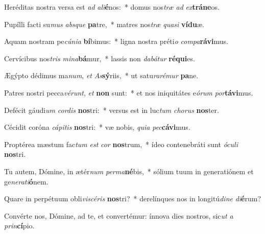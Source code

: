 \item Heréditas nostra versa est \textit{ad} \textit{a}\textit{li}\textbf{é}nos:~* domus nos\textit{træ} \textit{ad} \textit{ex}\textbf{trá}\textbf{ne}os.
\item Pupílli facti su\textit{mus} \textit{abs}\textit{que} \textbf{pa}tre,~* matres nos\textit{træ} \textit{qua}\textit{si} \textbf{ví}\textbf{du}æ.
\item Aquam nostram pe\textit{cú}\textit{ni}\textit{a} \textbf{bí}bimus:~* ligna nostra préti\textit{o} \textit{com}\textit{pa}\textbf{rá}\textbf{vi}mus.
\item Cervícibus nos\textit{tris} \textit{mi}\textit{na}\textbf{bá}mur,~* lassis non \textit{da}\textit{bá}\textit{tur} \textbf{ré}\textbf{qui}es.
\item Ægýpto dédimus ma\textit{num}, \textit{et} \textit{As}\textbf{sý}riis,~* ut satu\textit{ra}\textit{ré}\textit{mur} \textbf{pa}ne.
\item Patres nostri pecca\textit{vé}\textit{runt}, \textit{et} \textbf{non} sunt:~* et nos iniquitátes e\textit{ó}\textit{rum} \textit{por}\textbf{tá}\textbf{vi}mus.
\item Defécit gáudi\textit{um} \textit{cor}\textit{dis} \textbf{nos}tri:~* versus est in luc\textit{tum} \textit{cho}\textit{rus} \textbf{nos}ter.
\item Cécidit coróna \textit{cá}\textit{pi}\textit{tis} \textbf{nos}tri:~* væ nobis, \textit{qui}\textit{a} \textit{pec}\textbf{cá}\textbf{vi}mus.
\item Proptérea mæstum fac\textit{tum} \textit{est} \textit{cor} \textbf{nos}trum,~* ídeo contenebráti sunt \textit{ó}\textit{cu}\textit{li} \textbf{nos}tri.
\item Tu autem, Dómine, in ætér\textit{num} \textit{per}\textit{ma}\textbf{né}bis,~* sólium tuum in generatiónem et ge\textit{ne}\textit{ra}\textit{ti}\textbf{ó}nem.
\item Quare in perpétuum obli\textit{vi}\textit{scé}\textit{ris} \textbf{nos}tri?~* derelínques nos in longitú\textit{di}\textit{ne} \textit{di}\textbf{é}rum?
\item Convérte nos, Dómine, ad te, et convertémur: ínnova dies nostros, sic\textit{ut} \textit{a} \textit{prin}\textbf{cí}pio.
